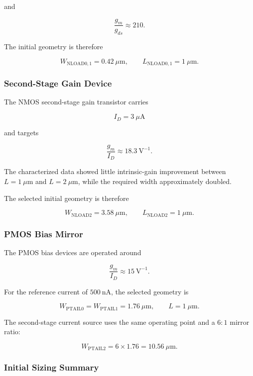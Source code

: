 and

\[
\frac{g_m}{g_{ds}} \approx 210.
\]

The initial geometry is therefore

\[
\boxed{
W_{\mathrm{NLOAD0,1}} = 0.42~\mu\mathrm{m},
\qquad
L_{\mathrm{NLOAD0,1}} = 1~\mu\mathrm{m}
}.
\]


\subsubsection{Second-Stage Gain Device}

The NMOS second-stage gain transistor carries

\[
I_D = 3~\mu\mathrm{A}
\]

and targets

\[
\frac{g_m}{I_D} \approx 18.3~\mathrm{V}^{-1}.
\]

The characterized data showed little intrinsic-gain improvement between
$L=1~\mu\mathrm{m}$ and $L=2~\mu\mathrm{m}$, while the required width
approximately doubled.

The selected initial geometry is therefore

\[
\boxed{
W_{\mathrm{NLOAD2}} = 3.58~\mu\mathrm{m},
\qquad
L_{\mathrm{NLOAD2}} = 1~\mu\mathrm{m}
}.
\]


\subsubsection{PMOS Bias Mirror}

The PMOS bias devices are operated around

\[
\frac{g_m}{I_D} \approx 15~\mathrm{V}^{-1}.
\]

For the reference current of $500~\mathrm{nA}$, the selected geometry is

\[
W_{\mathrm{PTAIL0}}
=
W_{\mathrm{PTAIL1}}
=
1.76~\mu\mathrm{m},
\qquad
L = 1~\mu\mathrm{m}.
\]

The second-stage current source uses the same operating point and a
$6:1$ mirror ratio:

\[
W_{\mathrm{PTAIL2}}
=
6 \times 1.76
=
10.56~\mu\mathrm{m}.
\]


\subsubsection{Initial Sizing Summary}

